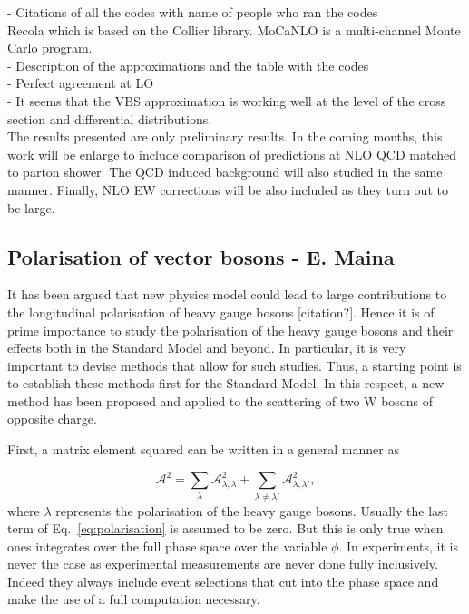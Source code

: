 - Citations of all the codes with name of people who ran the codes \\
Recola \cite{Actis:2012qn,Actis:2016mpe} which is based on the Collier \cite{Denner:2014gla,Denner:2016kdg} library.
MoCaNLO is a multi-channel Monte Carlo program. \\
- Description of the approximations and the table with the codes \\
- Perfect agreement at LO \\
- It seems that the VBS approximation is working well at the level of the cross section and differential distributions. \\

The results presented are only preliminary results.
In the coming months, this work will be enlarge to include comparison of predictions at NLO QCD matched to parton shower.
The QCD induced background will also studied in the same manner.
Finally, NLO EW corrections will be also included as they turn out to be large.

\subsection{Polarisation of vector bosons - E. Maina}

It has been argued that new physics model could lead to large contributions to the longitudinal polarisation of heavy gauge bosons [citation?].
Hence it is of prime importance to study the polarisation of the heavy gauge bosons and their effects both in the Standard Model and beyond.
In particular, it is very important to devise methods that allow for such studies.
Thus, a starting point is to establish these methods first for the Standard Model.
In this respect, a new method has been proposed and applied to the scattering of two W bosons of opposite charge.

First, a matrix element squared can be written in a general manner as

\begin{equation}
\label{eq:polarisation}
 \mathcal{A}^2 = \sum_{\lambda} \mathcal{A}^2_{\lambda, \lambda} + \sum_{\lambda \neq \lambda'} \mathcal{A}^2_{\lambda, \lambda'}, 
\end{equation}
%
where $\lambda$ represents the polarisation of the heavy gauge bosons.
Usually the last term of Eq.~\eqref{eq:polarisation} is assumed to be zero.
But this is only true when ones integrates over the full phase space over the variable $\phi$.
In experiments, it is never the case as experimental measurements are never done fully inclusively.
Indeed they always include event selections that cut into the phase space and make the use of a full computation necessary.

